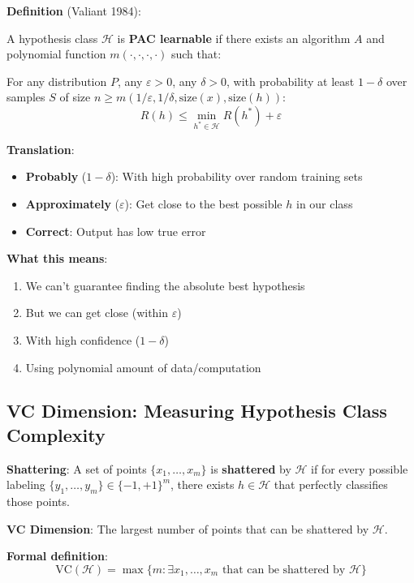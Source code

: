 \textbf{Definition} (Valiant 1984):

A hypothesis class $\mathcal{H}$ is \textbf{PAC learnable} if there exists an algorithm $A$ and polynomial function $m(\cdot,\cdot,\cdot,\cdot)$ such that:

For any distribution $P$, any $\varepsilon > 0$, any $\delta > 0$, with probability at least $1-\delta$ over samples $S$ of size $n \geq m(1/\varepsilon, 1/\delta, \text{size}(x), \text{size}(h))$:
\begin{equation}
R(h) \leq \min_{h^*\in\mathcal{H}} R(h^*) + \varepsilon
\end{equation}

\textbf{Translation}:
\begin{itemize}
    \item \textbf{Probably} ($1-\delta$): With high probability over random training sets
    \item \textbf{Approximately} ($\varepsilon$): Get close to the best possible $h$ in our class
    \item \textbf{Correct}: Output has low true error
\end{itemize}

\textbf{What this means}:
\begin{enumerate}
    \item We can't guarantee finding the absolute best hypothesis
    \item But we can get close (within $\varepsilon$)
    \item With high confidence ($1-\delta$)
    \item Using polynomial amount of data/computation
\end{enumerate}

\subsection{VC Dimension: Measuring Hypothesis Class Complexity}

\textbf{Shattering}: A set of points $\{x_1, \ldots, x_m\}$ is \textbf{shattered} by $\mathcal{H}$ if for every possible labeling $\{y_1, \ldots, y_m\} \in \{-1,+1\}^m$, there exists $h \in \mathcal{H}$ that perfectly classifies those points.

\textbf{VC Dimension}: The largest number of points that can be shattered by $\mathcal{H}$.

\textbf{Formal definition}:
\begin{equation}
\text{VC}(\mathcal{H}) = \max\{m : \exists x_1,\ldots,x_m \text{ that can be shattered by } \mathcal{H}\}
\end{equation}

